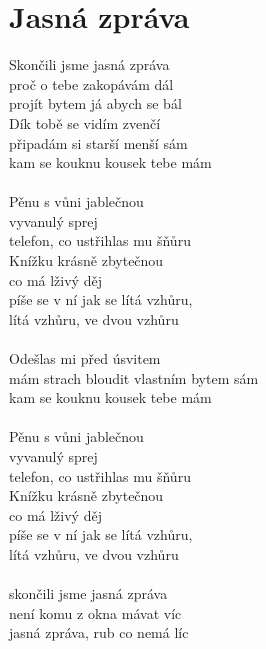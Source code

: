 \section{Jasná zpráva}
Skončili jsme jasná zpráva\\
proč o tebe zakopávám dál\\
projít bytem já abych se bál\\
Dík tobě se vidím zvenčí\\
připadám si starší menší sám\\
kam se kouknu kousek tebe mám\\
\\
Pěnu s vůni jablečnou\\
vyvanulý sprej\\
telefon, co ustřihlas mu šňůru\\
Knížku krásně zbytečnou\\
co má lživý děj\\
píše se v ní jak se lítá vzhůru,\\
lítá vzhůru, ve dvou vzhůru\\
\\
Odešlas mi před úsvitem\\
mám strach bloudit vlastním bytem sám\\
kam se kouknu kousek tebe mám\\
\\
Pěnu s vůni jablečnou\\
vyvanulý sprej\\
telefon, co ustřihlas mu šňůru\\
Knížku krásně zbytečnou\\
co má lživý děj\\
píše se v ní jak se lítá vzhůru,\\
lítá vzhůru, ve dvou vzhůru\\
\\
skončili jsme jasná zpráva\\
není komu z okna mávat víc\\
jasná zpráva, rub co nemá líc\\